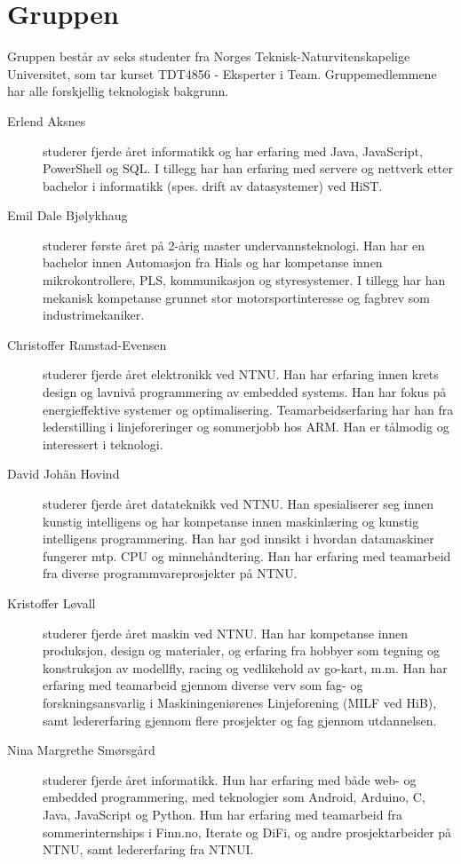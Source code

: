 \section{Gruppen}
Gruppen består av seks studenter fra Norges Teknisk-Naturvitenskapelige
Universitet, som tar kurset TDT4856 - Eksperter i Team. Gruppemedlemmene
har alle forskjellig teknologisk bakgrunn.
\begin{description} %

	\item[Erlend Aksnes] studerer fjerde året informatikk og har erfaring med Java, JavaScript, PowerShell og SQL. I tillegg har han erfaring med servere og nettverk etter bachelor i informatikk (spes. drift av datasystemer) ved HiST. 

	\item[Emil Dale Bjølykhaug] studerer første året på 2-årig master undervannsteknologi. 
Han har en bachelor innen Automasjon fra Hials og har kompetanse innen mikrokontrollere, PLS, 
kommunikasjon og styresystemer. I tillegg har han mekanisk kompetanse grunnet stor 
motorsportinteresse og fagbrev som industrimekaniker.

	\item[Christoffer Ramstad-Evensen] studerer fjerde
  året elektronikk ved NTNU. Han har erfaring innen krets design
  og lavnivå programmering av embedded systems. Han har fokus på energieffektive
  systemer og optimalisering. Teamarbeidserfaring har han fra lederstilling i
  linjeforeringer og sommerjobb hos ARM. Han er tålmodig og interessert i
  teknologi.
	\item[David Johän Hovind] studerer fjerde året datateknikk ved NTNU. 
	Han spesialiserer seg innen kunstig intelligens og har kompetanse innen maskinlæring
	og kunstig intelligens programmering. Han har god innsikt i hvordan datamaskiner fungerer
	mtp. CPU og minnehåndtering. Han har erfaring med teamarbeid fra diverse 
	programmvareprosjekter på NTNU.
	\item[Kristoffer Løvall] studerer fjerde året maskin ved NTNU. 
	Han har kompetanse innen produksjon, design og materialer, og erfaring
	fra hobbyer som tegning og konstruksjon av modellfly, racing og vedlikehold
	av go-kart, m.m. Han har erfaring med teamarbeid gjennom diverse verv som fag-
	og forskningsansvarlig i Maskiningeniørenes Linjeforening (MILF ved HiB), samt
	ledererfaring gjennom flere prosjekter og fag gjennom utdannelsen.
	
	\item[Nina Margrethe Smørsgård] studerer fjerde året
	informatikk. Hun har erfaring med både web- og embedded programmering, med
	teknologier som Android, Arduino, C, Java, JavaScript og Python. Hun har
	erfaring med teamarbeid fra sommerinternships i Finn.no, Iterate og DiFi,
	og andre prosjektarbeider på NTNU, samt ledererfaring fra NTNUI.
\end{description}
